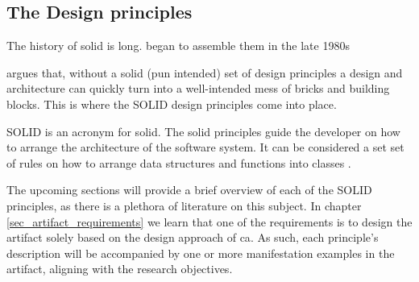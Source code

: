 \subsection{The Design principles} \label{subsec_design_principles}

The history of \gls{solid} is long. \textcite{robert_c_martin_clean_2018} began to
assemble them in the late 1980s

 argues that, without a solid (pun intended) set of
design principles a design and architecture can quickly turn into a well-intended mess
of bricks and building blocks. This is where the SOLID design principles come into place.

SOLID is an acronym for \gls{solid}. The \gls{solid} principles guide the developer on how
to arrange the architecture of the software system. It can be considered a set set of
rules on how to arrange data structures and functions into classes
\parencite[78]{robert_c_martin_clean_2018}.

The upcoming sections will provide a brief overview of each of the SOLID principles, as
there is a plethora of literature on this subject. In chapter
\ref{sec_artifact_requirements} we learn that one of the requirements is to design the
artifact solely based on the design approach of \gls{ca}. As such, each principle's description
will be accompanied by one or more manifestation examples in the artifact, aligning with
the research objectives.